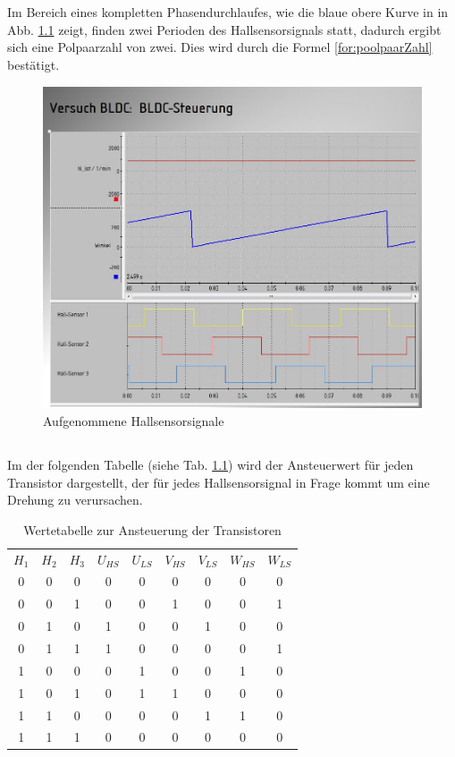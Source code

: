 \chapter{}\label{ex:aufg4}
%
\section{}\label{sec:aufg4a}
Im Bereich eines kompletten Phasendurchlaufes, wie die blaue obere Kurve in in Abb. \ref{fig:aufgenommen_hallSensorSig} zeigt, finden zwei Perioden des Hallsensorsignals statt, dadurch ergibt sich eine Polpaarzahl von zwei. Dies wird durch die Formel \ref{for:poolpaarZahl} best\"atigt.
\begin{figure}[htb]
	\includegraphics[width = \textwidth]{./Bilder/bldc_aufgenommenSig}
	\caption{Aufgenommene Hallsensorsignale}
	\label{fig:aufgenommen_hallSensorSig}
\end{figure}
\newpage
\section{}\label{sec:aufg4b}
Im der folgenden Tabelle (siehe Tab. \ref{tab:T_Ansteuerung}) wird der Ansteuerwert für jeden Transistor dargestellt, der für jedes Hallsensorsignal in Frage kommt um eine Drehung zu verursachen.

\begin{table}[htb]
	\centering
\begin{tabular}{ccc||cccccc}
	$H_1$ & $H_2$ & $H_3$ & $U_{HS}$ & $U_{LS}$ & $V_{HS}$ & $V_{LS}$ & $W_{HS}$ & $W_{LS}$ \\ 
	0&0&0&0&0&0&0&0&0\\
	0&0&1&0&0&1&0&0&1\\
	0&1&0&1&0&0&1&0&0\\
	0&1&1&1&0&0&0&0&1\\
	1&0&0&0&1&0&0&1&0\\
	1&0&1&0&1&1&0&0&0\\
	1&1&0&0&0&0&1&1&0\\
	1&1&1&0&0&0&0&0&0
\end{tabular}  
\caption{Wertetabelle zur Ansteuerung der Transistoren}
\label{tab:T_Ansteuerung}
\end{table}